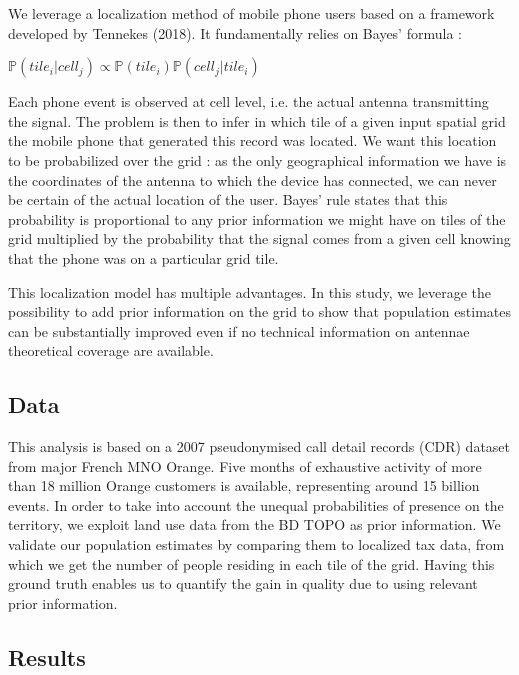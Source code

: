 We leverage a localization method of mobile phone users based on a framework developed by Tennekes (2018). It fundamentally relies on Bayes' formula :

\begin{center}
\begingroup
\large
$\mathbb{P}(tile_i | cell_j) \propto \mathbb{P}(tile_i) \mathbb{P}(cell_j | tile_i)$
\endgroup
\end{center}

Each phone event is observed at cell level, i.e. the actual antenna transmitting the signal. 
The problem is then to infer in which tile of a given input spatial grid the mobile phone that generated this record was located. We want this location to be probabilized over the grid : as the only geographical information we have is the coordinates of the antenna to which the device has connected, we can never be certain of the actual location of the user. Bayes' rule states that this probability is proportional to any prior information we might have on tiles of the grid multiplied by the probability that the signal comes from a given cell knowing that the phone was on a particular grid tile. 

This localization model has multiple advantages. In this study, we leverage the possibility to add prior information on the grid to show that population estimates can be substantially improved even if no technical information on antennae theoretical coverage are available.

\subsection*{Data}

This analysis is based on a 2007 pseudonymised call detail records (CDR) dataset from major French MNO Orange. Five months of exhaustive activity of more than 18 million Orange customers is available, representing around 15 billion events. In order to take into account the unequal probabilities of presence on the territory, we exploit land use data from the BD TOPO as prior information. We validate our population estimates by comparing them to localized tax data, from which we get the number of people residing in each tile of the grid. Having this ground truth enables us to quantify the gain in quality due to using relevant prior information.

\subsection*{Results}

